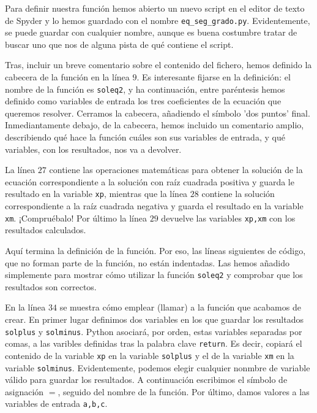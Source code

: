 \begin{paracol}{2}
    Para definir nuestra función hemos abierto un nuevo script en el editor de texto de Spyder y lo hemos guardado con el nombre \texttt{eq\_seg\_grado.py}. Evidentemente, se puede guardar con cualquier nombre, aunque es buena costumbre tratar de buscar uno que nos de alguna pista de qué contiene el script.

    Tras, incluir un breve comentario sobre el contenido del fichero, hemos definido la cabecera de la función en la línea $9$. Es interesante fijarse en la definición: el nombre de la función es \texttt{soleq2}, y ha continuación, entre paréntesis hemos definido como variables de entrada los tres coeficientes de la ecuación que queremos resolver. Cerramos la cabecera, añadiendo el símbolo 'dos puntos' final. Inmediantamente debajo, de la cabecera, hemos incluido un comentario amplio, describiendo qué hace la función cuáles son sus variables de entrada, y qué variables, con los resultados, nos va a devolver.

    La línea $27$ contiene las operaciones matemáticas para obtener la solución de la ecuación correspondiente a la solución con raíz cuadrada positiva y guarda le resultado en la variable \texttt{xp}, mientras que la línea $28$ contiene la solución  correspondiente a la raíz cuadrada negativa y guarda el resultado en la variable \texttt{xm}. ¡Compruébalo!
    Por último la línea $29$ devuelve las variables \texttt{xp,xm} con los resultados calculados.

    Aquí termina la definición de la función. Por eso, las líneas siguientes de código, que no forman parte de la función, no están indentadas. Las hemos añadido simplemente para mostrar cómo utilizar la función \texttt{soleq2} y comprobar que los resultados son correctos.

    En la línea $34$ se muestra cómo emplear (llamar) a la función que acabamos de crear. En primer lugar definimos dos variables en los que guardar los resultados \texttt{solplus} y \texttt{solminus}. Python asociará, por orden, estas variables separadas por comas, a las varibles definidas tras la palabra clave \texttt{return}. Es decir, copiará el contenido de la variable \texttt{xp} en la variable \texttt{solplus} y el de la variable \texttt{xm} en la variable \texttt{solminus}. Evidentemente, podemos elegir cualquier nonmbre de variable válido para guardar los resultados. A continuación escribimos el símbolo de asignación $=$, seguido del nombre de la función. Por último, damos valores a las variables de entrada \texttt{a,b,c}.


\end{paracol}
